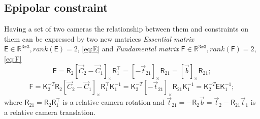 \subsection{Epipolar constraint}

Having a set of two cameras the relationship between them and constraints on them can be expressed by two new matrices \textit{Essential matrix} $\pmb{\mathsf{E}} \in \mathbb{R}^{3x3}, rank(\pmb{\mathsf{E}}) = 2$, \autoref{eq:E} and \textit{Fundamental matrix} $\pmb{\mathsf{F}} \in \mathbb{R}^{3x3}, rank(\pmb{\mathsf{F}}) = 2$, \autoref{eq:F}
\begin{equation}
    \label{eq:E}
    \pmb{\mathsf{E}} = \pmb{\mathsf{R}}_2 [\vec{C}_2 - \vec{C}_1]_{\times} \pmb{\mathsf{R}}_1^\top = [-\vec{t}_{21}]_{\times} \pmb{\mathsf{R}}_{21} = [\vec{b}]_{\times} \pmb{\mathsf{R}}_{21};
\end{equation}
\begin{equation}
    \label{eq:F}
    \pmb{\mathsf{F}} = \pmb{\mathsf{K}}_2^{-T} \pmb{\mathsf{R}}_2 [\vec{C}_2 - \vec{C}_1]_{\times} \pmb{\mathsf{R}}_1^\top \pmb{\mathsf{K}}_1^{-1} = 
    \pmb{\mathsf{K}}_2^{-T} [-\vec{t}_{21}]_{\times} \pmb{\mathsf{R}}_{21} \pmb{\mathsf{K}}_1^{-1} = 
    \pmb{\mathsf{K}}_2^{-T} \pmb{\mathsf{E}} \pmb{\mathsf{K}}_1^{-1};
\end{equation}
where 
$\pmb{\mathsf{R}}_{21} = \pmb{\mathsf{R}}_2 \pmb{\mathsf{R}}_1^\top$ is a relative camera rotation and 
$\vec{t}_{21} = -\pmb{\mathsf{R}}_2 \vec{b} = \vec{t}_2 - \pmb{\mathsf{R}}_{21}\vec{t}_1$ is a relative camera translation.

